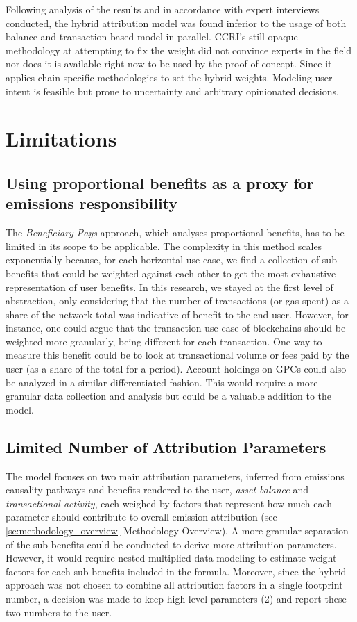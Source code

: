 \documentclass[11pt]{report}
\begin{document}
Following analysis of the results and in accordance with expert interviews conducted, the hybrid attribution model was found inferior to the usage of both balance and transaction-based model in parallel. CCRI's still opaque methodology at attempting to fix the weight did not convince experts in the field nor does it is available right now to be used by the proof-of-concept. Since it applies chain specific methodologies to set the hybrid weights. Modeling user intent is feasible but prone to uncertainty and arbitrary opinionated decisions.

\section{Limitations}

\subsection*{Using proportional benefits as a proxy for emissions responsibility}
The \textit{Beneficiary Pays} approach, which analyses proportional benefits, has to be limited in its scope to be applicable. The complexity in this method scales exponentially because, for each horizontal use case, we find a collection of sub-benefits that could be weighted against each other to get the most exhaustive representation of user benefits. In this research, we stayed at the first level of abstraction, only considering that the number of transactions (or gas spent) as a share of the network total was indicative of benefit to the end user. However, for instance, one could argue that the transaction use case of blockchains should be weighted more granularly, being different for each transaction. One way to measure this benefit could be to look at transactional volume or fees paid by the user (as a share of the total for a period). Account holdings on GPCs could also be analyzed in a similar differentiated fashion. This would require a more granular data collection and analysis but could be a valuable addition to the model.

\subsection*{Limited Number of Attribution Parameters}
The model focuses on two main attribution parameters, inferred from emissions causality pathways and benefits rendered to the user, \textit{asset balance} and \textit{transactional activity}, each weighed by factors that represent how much each parameter should contribute to overall emission attribution (see \ref{se:methodology_overview} Methodology Overview). A more granular separation of the sub-benefits could be conducted to derive more attribution parameters. However, it would require nested-multiplied data modeling to estimate weight factors for each sub-benefits included in the formula. Moreover, since the hybrid approach was not chosen to combine all attribution factors in a single footprint number, a decision was made to keep high-level parameters (2) and report these two numbers to the user.
\end{document}
